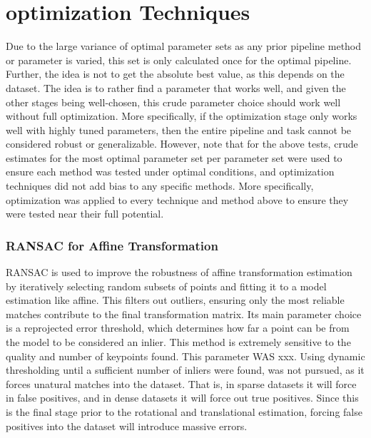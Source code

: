 \section*{optimization Techniques}
Due to the large variance of optimal parameter sets as any prior pipeline method or parameter is varied, this set is only calculated once for the optimal pipeline. Further, the idea is not to get the absolute best value, as this depends on the dataset. The idea is to rather find a parameter that works well, and given the other stages being well-chosen, this crude parameter choice should work well without full optimization. More specifically, if the optimization stage only works well with highly tuned parameters, then the entire pipeline and task cannot be considered robust or generalizable.  
However, note that for the above tests, crude estimates for the most optimal parameter set per parameter set were used to ensure each method was tested under optimal conditions, and optimization techniques did not add bias to any specific methods. More specifically, optimization was applied to every technique and method above to ensure they were tested near their full potential. 

\subsubsection*{RANSAC for Affine Transformation}
RANSAC is used to improve the robustness of affine transformation estimation by iteratively selecting random subsets of points and fitting it to a model estimation like affine. This filters out outliers, ensuring only the most reliable matches contribute to the final transformation matrix. 
Its main parameter choice is a reprojected error threshold, which determines how far a point can be from the model to be considered an inlier. This method is extremely sensitive to the quality and number of keypoints found. This parameter WAS xxx. Using dynamic thresholding until a sufficient number of inliers were found, was not pursued, as it forces unatural matches into the dataset. That is, in sparse datasets it will force in false positives, and in dense datasets it will force out true positives. Since this is the final stage prior to the rotational and translational estimation, forcing false positives into the dataset will introduce massive errors. 

